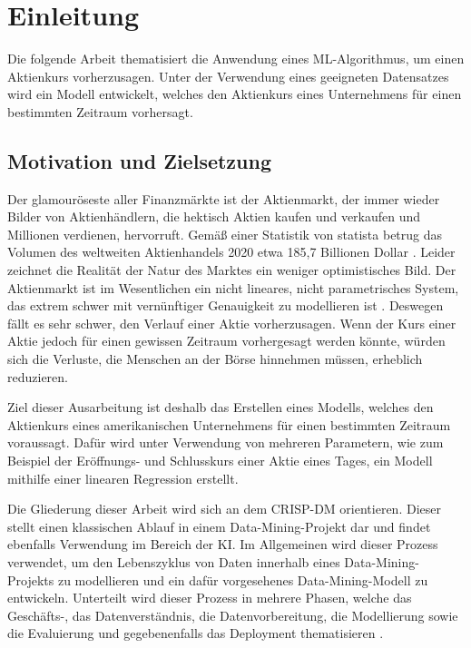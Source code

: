 \chapter{Einleitung}
Die folgende Arbeit thematisiert die Anwendung eines \ac{ML}-Algorithmus, um einen Aktienkurs vorherzusagen. Unter der Verwendung eines geeigneten Datensatzes wird ein Modell entwickelt, welches den Aktienkurs eines Unternehmens für einen bestimmten Zeitraum vorhersagt.

\section{Motivation und Zielsetzung}\label{sec:motivation}
Der glamouröseste aller Finanzmärkte ist der Aktienmarkt, der immer wieder Bilder von Aktienhändlern, die hektisch Aktien kaufen und verkaufen und Millionen verdienen, hervorruft. Gemäß einer Statistik von statista betrug das Volumen des weltweiten Aktienhandels 2020 etwa 185,7 Billionen Dollar \parencite{Statista.22.03.2022}. Leider zeichnet die Realität der Natur des Marktes ein weniger optimistisches Bild. Der Aktienmarkt ist im Wesentlichen ein nicht lineares, nicht parametrisches System, das extrem schwer mit vernünftiger Genauigkeit zu modellieren ist \parencite[vgl.][S. 13]{Wang.2003}. Deswegen fällt es sehr schwer, den Verlauf einer Aktie vorherzusagen. Wenn der Kurs einer Aktie jedoch für einen gewissen Zeitraum vorhergesagt werden könnte, würden sich die Verluste, die Menschen an der Börse hinnehmen müssen, erheblich reduzieren.


Ziel dieser Ausarbeitung ist deshalb das Erstellen eines Modells, welches den Aktienkurs eines amerikanischen Unternehmens für einen bestimmten Zeitraum voraussagt. Dafür wird unter Verwendung von mehreren Parametern, wie zum Beispiel der Eröffnungs- und Schlusskurs einer Aktie eines Tages, ein Modell mithilfe einer linearen Regression erstellt.

Die Gliederung dieser Arbeit wird sich an dem \ac{CRISP-DM} orientieren. Dieser stellt einen klassischen Ablauf in einem Data-Mining-Projekt dar und findet ebenfalls Verwendung im Bereich der KI. Im Allgemeinen wird dieser Prozess verwendet, um den Lebenszyklus von Daten innerhalb eines Data-Mining-Projekts zu modellieren und ein dafür vorgesehenes Data-Mining-Modell zu entwickeln. Unterteilt wird dieser Prozess in mehrere Phasen, welche das Geschäfts-, das Datenverständnis, die Datenvorbereitung, die Modellierung sowie die Evaluierung und gegebenenfalls das Deployment thematisieren \parencite[vgl.][S. 5ff.]{.Wirth}. 